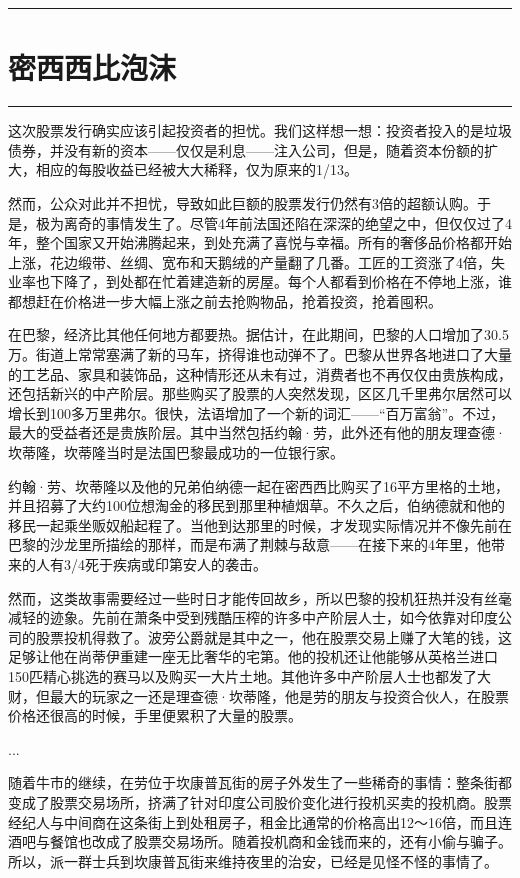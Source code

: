 \documentclass[12pt,oneside]{book}
\newcommand\hr{\par\noindent\hrule}
\begin{document}
\hr

\section{密西西比泡沫}
\hr
这次股票发行确实应该引起投资者的担忧。我们这样想一想：投资者投入的是垃圾债券，并没有新的资本——仅仅是利息——注入公司，但是，随着资本份额的扩大，相应的每股收益已经被大大稀释，仅为原来的1/13。

然而，公众对此并不担忧，导致如此巨额的股票发行仍然有3倍的超额认购。于是，极为离奇的事情发生了。尽管4年前法国还陷在深深的绝望之中，但仅仅过了4年，整个国家又开始沸腾起来，到处充满了喜悦与幸福。所有的奢侈品价格都开始上涨，花边缎带、丝绸、宽布和天鹅绒的产量翻了几番。工匠的工资涨了4倍，失业率也下降了，到处都在忙着建造新的房屋。每个人都看到价格在不停地上涨，谁都想赶在价格进一步大幅上涨之前去抢购物品，抢着投资，抢着囤积。

在巴黎，经济比其他任何地方都要热。据估计，在此期间，巴黎的人口增加了30.5万。街道上常常塞满了新的马车，挤得谁也动弹不了。巴黎从世界各地进口了大量的工艺品、家具和装饰品，这种情形还从未有过，消费者也不再仅仅由贵族构成，还包括新兴的中产阶层。那些购买了股票的人突然发现，区区几千里弗尔居然可以增长到100多万里弗尔。很快，法语增加了一个新的词汇——“百万富翁”。不过，最大的受益者还是贵族阶层。其中当然包括约翰·劳，此外还有他的朋友理查德·坎蒂隆，坎蒂隆当时是法国巴黎最成功的一位银行家。

约翰·劳、坎蒂隆以及他的兄弟伯纳德一起在密西西比购买了16平方里格的土地，并且招募了大约100位想淘金的移民到那里种植烟草。不久之后，伯纳德就和他的移民一起乘坐贩奴船起程了。当他到达那里的时候，才发现实际情况并不像先前在巴黎的沙龙里所描绘的那样，而是布满了荆棘与敌意——在接下来的4年里，他带来的人有3/4死于疾病或印第安人的袭击。

然而，这类故事需要经过一些时日才能传回故乡，所以巴黎的投机狂热并没有丝毫减轻的迹象。先前在萧条中受到残酷压榨的许多中产阶层人士，如今依靠对印度公司的股票投机得救了。波旁公爵就是其中之一，他在股票交易上赚了大笔的钱，这足够让他在尚蒂伊重建一座无比奢华的宅第。他的投机还让他能够从英格兰进口150匹精心挑选的赛马以及购买一大片土地。其他许多中产阶层人士也都发了大财，但最大的玩家之一还是理查德·坎蒂隆，他是劳的朋友与投资合伙人，在股票价格还很高的时候，手里便累积了大量的股票。

...

随着牛市的继续，在劳位于坎康普瓦街的房子外发生了一些稀奇的事情：整条街都变成了股票交易场所，挤满了针对印度公司股价变化进行投机买卖的投机商。股票经纪人与中间商在这条街上到处租房子，租金比通常的价格高出12～16倍，而且连酒吧与餐馆也改成了股票交易场所。随着投机商和金钱而来的，还有小偷与骗子。所以，派一群士兵到坎康普瓦街来维持夜里的治安，已经是见怪不怪的事情了。
\end{document}
